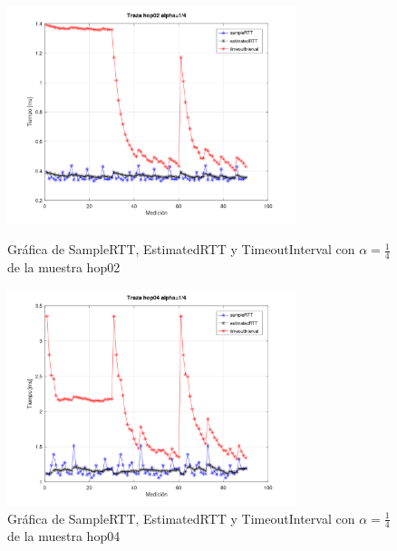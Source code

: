 \begin{figure}[H]
    \centering
    \includegraphics[width=0.75\textwidth]{img/alpha14/trazaHop02.png}
    \caption{Gráfica de SampleRTT, EstimatedRTT y TimeoutInterval con \( \alpha = \frac{1}{4} \)
    de la muestra hop02}

    \includegraphics[width=0.75\textwidth]{img/alpha14/trazaHop04.png}
    \caption{Gráfica de SampleRTT, EstimatedRTT y TimeoutInterval con \( \alpha = \frac{1}{4} \)
    de la muestra hop04}
    \label{fig:alpha1_p1}
\end{figure}
\newpage
